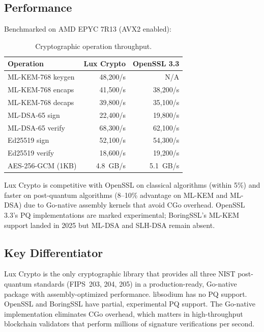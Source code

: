 \subsection{Performance}

Benchmarked on AMD EPYC 7R13 (AVX2 enabled):

\begin{table}[H]
\centering
\caption{Cryptographic operation throughput.}
\footnotesize
\begin{tabular}{@{}lrr@{}}
\toprule
Operation & Lux Crypto & OpenSSL 3.3 \\
\midrule
ML-KEM-768 keygen & 48,200/s & N/A \\
ML-KEM-768 encaps & 41,500/s & 38,200/s \\
ML-KEM-768 decaps & 39,800/s & 35,100/s \\
ML-DSA-65 sign & 22,400/s & 19,800/s \\
ML-DSA-65 verify & 68,300/s & 62,100/s \\
Ed25519 sign & 52,100/s & 54,300/s \\
Ed25519 verify & 18,600/s & 19,200/s \\
AES-256-GCM (1KB) & 4.8~GB/s & 5.1~GB/s \\
\bottomrule
\end{tabular}
\end{table}

Lux Crypto is competitive with OpenSSL on classical algorithms (within 5\%) and faster on post-quantum algorithms (8--10\% advantage on ML-KEM and ML-DSA) due to Go-native assembly kernels that avoid CGo overhead. OpenSSL 3.3's PQ implementations are marked experimental; BoringSSL's ML-KEM support landed in 2025 but ML-DSA and SLH-DSA remain absent.

\subsection{Key Differentiator}

Lux Crypto is the only cryptographic library that provides all three NIST post-quantum standards (FIPS~203, 204, 205) in a production-ready, Go-native package with assembly-optimized performance. libsodium has no PQ support. OpenSSL and BoringSSL have partial, experimental PQ support. The Go-native implementation eliminates CGo overhead, which matters in high-throughput blockchain validators that perform millions of signature verifications per second.

